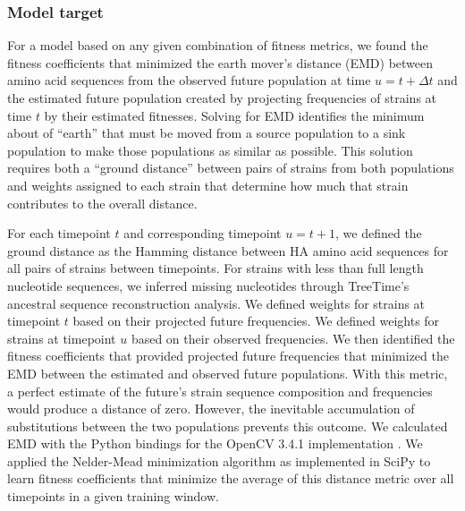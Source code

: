 \documentclass[9pt,lineno]{elife} %
\providecommand{\DIFaddbegin}{} %
\providecommand{\DIFaddend}{} %
\providecommand{\DIFdelbegin}{} %
\providecommand{\DIFdelend}{} %
\providecommand{\DIFaddbegin}{} %
\providecommand{\DIFaddend}{} %
\providecommand{\DIFdelbegin}{} %
\providecommand{\DIFdelend}{} %
\newcommand{\DIFscaledelfig}{0.5}
\newlength{\DIFdelgraphicswidth} %
\newlength{\DIFdelgraphicsheight} %
\newcommand{\DIFaddincludegraphics}[2][]{{\color{blue}\fbox{\DIFOincludegraphics[#1]{#2}}}} %
\newcommand{\DIFdelincludegraphics}[2][]{%
\sbox{\DIFdelgraphicsbox}{\DIFOincludegraphics[#1]{#2}}%
\settoboxwidth{\DIFdelgraphicswidth}{\DIFdelgraphicsbox} %
\settoboxtotalheight{\DIFdelgraphicsheight}{\DIFdelgraphicsbox} %
\scalebox{\DIFscaledelfig}{%
\parbox[b]{\DIFdelgraphicswidth}{\usebox{\DIFdelgraphicsbox}\\[-\baselineskip] \rule{\DIFdelgraphicswidth}{0em}}\llap{\resizebox{\DIFdelgraphicswidth}{\DIFdelgraphicsheight}{%
\setlength{\unitlength}{\DIFdelgraphicswidth}%
\begin{picture}(1,1)%
\thicklines\linethickness{2pt} %
{\color[rgb]{1,0,0}\put(0,0){\framebox(1,1){}}}%
{\color[rgb]{1,0,0}\put(0,0){\line( 1,1){1}}}%
{\color[rgb]{1,0,0}\put(0,1){\line(1,-1){1}}}%
\end{picture}%
}\hspace*{3pt}}} %
} %
\DeclareRobustCommand{\DIFaddbegin}{\DIFOaddbegin \let\includegraphics\DIFaddincludegraphics} %
\DeclareRobustCommand{\DIFaddend}{\DIFOaddend \let\includegraphics\DIFOincludegraphics} %
\DeclareRobustCommand{\DIFdelbegin}{\DIFOdelbegin \let\includegraphics\DIFdelincludegraphics} %
\DeclareRobustCommand{\DIFdelend}{\DIFOaddend \let\includegraphics\DIFOincludegraphics} %
\begin{document}
\subsubsection*{Model target}

For a model based on any given combination of fitness metrics, we found the fitness coefficients that minimized the earth mover's distance (EMD) \DIFdelbegin %
\DIFdelend \DIFaddbegin \citep{Rubner1998,Kusner2015} \DIFaddend between amino acid sequences from the observed future population at time $u = t + \Delta{t}$ and the estimated future population created by projecting frequencies of strains at time $t$ by their estimated fitnesses.
Solving for EMD identifies the minimum about of ``earth'' that must be moved from a source population to a sink population to make those populations as similar as possible.
This solution requires both a ``ground distance'' between pairs of strains from both populations and weights assigned to each strain that determine how much that strain contributes to the overall distance.

For each timepoint $t$ and corresponding timepoint $u = t + 1$, we defined the ground distance as the Hamming distance between HA amino acid sequences for all pairs of strains between timepoints.
For strains with less than full length nucleotide sequences, we inferred missing nucleotides through TreeTime's ancestral sequence reconstruction analysis.
We defined weights for strains at timepoint $t$ based on their projected future frequencies.
We defined weights for strains at timepoint $u$ based on their observed frequencies.
We then identified the fitness coefficients that provided projected future frequencies that minimized the EMD between the estimated and observed future populations.
With this metric, a perfect estimate of the future's strain sequence composition and frequencies would produce a distance of zero.
However, the inevitable accumulation of substitutions between the two populations prevents this outcome.
We calculated EMD with the Python bindings for the OpenCV 3.4.1 implementation \DIFdelbegin %
\DIFdelend \DIFaddbegin \citep{opencv_library}\DIFaddend .
We applied the Nelder-Mead minimization algorithm as implemented in SciPy \DIFdelbegin %
\DIFdelend \DIFaddbegin \citep{virtanen_scipy_2020} \DIFaddend to learn fitness coefficients that minimize the average of this distance metric over all timepoints in a given training window.
\end{document}
